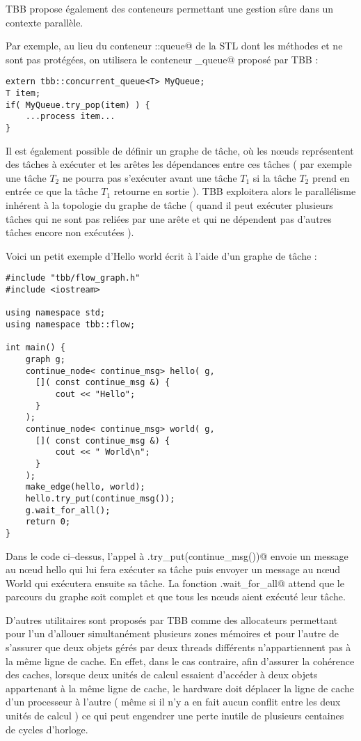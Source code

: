 \documentclass[fleqn,11pt]{article}
\begin{document}
TBB propose également des conteneurs permettant une gestion sûre dans un contexte parallèle.

Par exemple, au lieu du conteneur \lstinline@std::queue@ de la STL dont les méthodes
\lstinline@push@ et \lstinline@pop@ ne sont pas protégées, on utilisera le
conteneur \lstinline@concurrent_queue@ proposé par TBB : 
\begin{lstlisting}
extern tbb::concurrent_queue<T> MyQueue;
T item;
if( MyQueue.try_pop(item) ) {
    ...process item...
}
\end{lstlisting}

Il est également possible de définir un graphe de tâche, où les n{\oe}uds représentent
des tâches à exécuter et les arêtes les dépendances entre ces tâches ( par exemple une tâche
$T_{2}$ ne pourra pas s'exécuter avant une tâche $T_{1}$ si la tâche $T_{2}$ prend en entrée
ce que la tâche $T_{1}$ retourne en sortie ). TBB exploitera alors le parallélisme
inhérent à la topologie du graphe de tâche ( quand il peut exécuter plusieurs tâches qui ne sont pas reliées
par une arête et qui ne dépendent pas d'autres tâches encore non exécutées ). 

Voici un petit exemple d'Hello  world écrit à l'aide d'un graphe de tâche :

\begin{lstlisting}
#include "tbb/flow_graph.h"
#include <iostream>

using namespace std;
using namespace tbb::flow;

int main() {
    graph g;
    continue_node< continue_msg> hello( g,
      []( const continue_msg &) {
          cout << "Hello";
      }
    );
    continue_node< continue_msg> world( g,
      []( const continue_msg &) {
          cout << " World\n";
      }
    );
    make_edge(hello, world);
    hello.try_put(continue_msg());
    g.wait_for_all();
    return 0;
}
\end{lstlisting}

Dans le code ci--dessus, l'appel à \lstinline@hello.try_put(continue_msg())@
envoie un message au n{\oe}ud hello qui lui fera exécuter sa tâche puis envoyer
un message au n{\oe}ud World qui exécutera ensuite sa tâche. La fonction
\verb@g.wait_for_all@ attend que le parcours du graphe soit complet et que tous
les n{\oe}uds aient exécuté leur tâche.

D'autres utilitaires sont proposés par TBB comme des allocateurs permettant pour l'un
d'allouer simultanément plusieurs zones mémoires et pour l'autre de s'assurer que deux objets
gérés par deux threads différents n'appartiennent pas à la même ligne de cache. En effet, dans
le cas contraire, afin d'assurer la cohérence des caches, lorsque deux unités de calcul essaient
d'accéder à deux objets appartenant à la même ligne de cache, le hardware doit déplacer la ligne
de cache d'un processeur à l'autre ( même si il n'y a en fait aucun conflit entre les deux
unités de calcul ) ce qui peut engendrer une perte inutile de plusieurs centaines de cycles
d'horloge.
\end{document}
